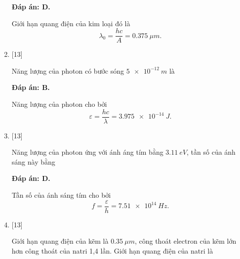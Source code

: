 \begin{enumerate}[label=\bfseries Câu \arabic*:]
	\loigiai
	{		\textbf{Đáp án: D.}
		
		Giới hạn quang điện của kim loại đó là
		$$
		\lambda_{0} = \dfrac{hc}{A} = \SI{0,375}{\mu m}.
		$$
	}
	
	\item {} [13]
	\cauhoi
	{Năng lượng của photon có bước sóng $\SI{5e-12}{m}$ là
	}
	
	\loigiai
	{		\textbf{Đáp án: B.}
		
		Năng lượng của photon cho bởi
		$$
		\varepsilon = \dfrac{hc}{\lambda} = \SI{3,975e-14}{J}. 
		$$
	}
	
	\item {} [13]
	\cauhoi
	{Năng lượng của photon ứng với ánh áng tím bằng $\SI{3,11}{eV}$, tần số của ánh sáng này bằng
	}
	
	\loigiai
	{		\textbf{Đáp án: D.}
		
		Tần số của ánh sáng tím cho bởi
		$$
		f = \dfrac{\varepsilon}{h} = \SI{7,51e14}{Hz}.
		$$
	}
	
	\item {} [13]
	\cauhoi
	{Giới hạn quang điện của kẽm là $\SI{0,35}{\mu m}$, công thoát electron của kẽm lớn hơn công thoát của natri 1,4 lần. Giới hạn quang điện của natri là
	}
	

\end{enumerate}
